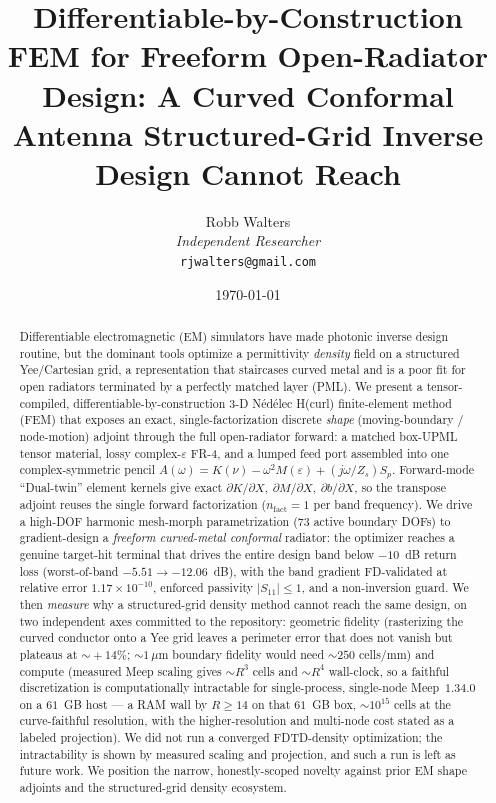 \documentclass{anvil-paper}
\title{Differentiable-by-Construction FEM for Freeform Open-Radiator Design:
A Curved Conformal Antenna Structured-Grid Inverse Design Cannot Reach}
\author{Robb Walters\\[2pt]
  {\small\itshape Independent Researcher}\\
  {\small\texttt{rjwalters@gmail.com}}}
\date{\today}
\begin{document}
\maketitle

\begin{abstract}
Differentiable electromagnetic (EM) simulators have made photonic inverse
design routine, but the dominant tools optimize a permittivity \emph{density}
field on a structured Yee/Cartesian grid, a representation that staircases
curved metal and is a poor fit for open radiators terminated by a perfectly
matched layer (PML). We present a tensor-compiled, differentiable-by-construction
3-D N\'ed\'elec H(curl) finite-element method (FEM) that exposes an exact,
single-factorization discrete \emph{shape} (moving-boundary / node-motion)
adjoint through the full open-radiator forward: a matched box-UPML tensor
material, lossy complex-$\varepsilon$ FR-4, and a lumped feed port assembled into
one complex-symmetric pencil $A(\omega)=K(\nu)-\omega^2 M(\varepsilon)+(j\omega/Z_s)S_p$.
Forward-mode ``Dual-twin'' element kernels give exact
$\partial K/\partial X,\ \partial M/\partial X,\ \partial b/\partial X$, so the
transpose adjoint reuses the single forward factorization
($n_{\text{fact}}=1$ per band frequency). We drive a high-DOF harmonic
mesh-morph parametrization (73 active boundary DOFs) to gradient-design a
\emph{freeform curved-metal conformal} radiator: the optimizer reaches a genuine
target-hit terminal that drives the entire design band below $-10$~dB return
loss (worst-of-band $-5.51 \to -12.06$~dB), with the band gradient FD-validated
at relative error $1.17\times10^{-10}$, enforced passivity $|S_{11}|\le1$, and a
non-inversion guard. We then \emph{measure} why a structured-grid density method
cannot reach the same design, on two independent axes committed to the
repository: geometric fidelity (rasterizing the curved conductor onto a Yee grid
leaves a perimeter error that does not vanish but plateaus at $\sim\!+14\%$;
$\sim\!1\,\mu$m boundary fidelity would need $\sim\!250$ cells/mm) and compute
(measured Meep scaling gives $\sim\!R^3$ cells and $\sim\!R^4$ wall-clock, so a
faithful discretization is computationally intractable for single-process,
single-node Meep~$1.34.0$ on a $61$~GB host --- a RAM wall by
$R\!\ge\!14$ on that $61$~GB box, $\sim\!10^{15}$ cells at the curve-faithful
resolution, with the higher-resolution and multi-node cost stated as a labeled
projection). We did not run a converged FDTD-density optimization; the
intractability is shown by measured scaling and projection, and such a run is
left as future work. We position the narrow, honestly-scoped novelty against
prior EM shape adjoints and the structured-grid density ecosystem.
\end{abstract}
\end{document}
